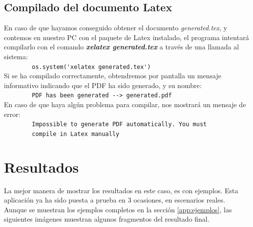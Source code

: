 \documentclass[a4paper, 12pt]{book}
\begin{document}
\section{Compilado del documento Latex}
\label{sec:compilado}
En caso de que hayamos conseguido obtener el documento \textit{generated.tex}, y contemos en nuestro PC con el paquete de Latex instalado, el programa intentará compilarlo con el comando \textbf{\textit{xelatex generated.tex}} a través de una llamada al sistema:\\
\verb"        os.system('xelatex generated.tex')"\\

Si se ha compilado correctamente, obtendremos por pantalla un mensaje informativo indicando que el PDF ha sido generado, y su nombre:\\
\verb"        PDF has been generated --> generated.pdf"\\

En caso de que haya algún problema para compilar, nos mostrará un mensaje de error:\\
\verb"        Impossible to generate PDF automatically. You must"\\
\verb"        compile in Latex manually"



\cleardoublepage
\chapter{Resultados}
\label{chap:resultados}
La mejor manera de mostrar los resultados en este caso, es con ejemplos. Esta aplicación ya ha sido puesta a prueba en 3 ocasiones, en escenarios reales.\\

Aunque se muestran los ejemplos completos en la sección \ref{app:ejemplos}, las siguientes imágenes muestran algunos fragmentos del resultado final.\\
\end{document}
